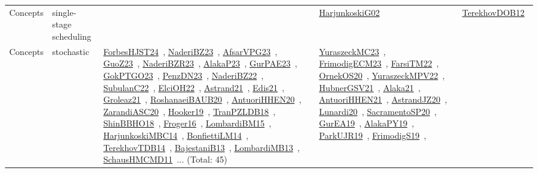 {\begin{longtable}{lp{3cm}>{\raggedright\arraybackslash}p{6cm}>{\raggedright\arraybackslash}p{6cm}>{\raggedright\arraybackslash}p{8cm}}
\index{single-stage scheduling}\index{Concepts!single-stage scheduling}Concepts & single-stage scheduling &  & \href{../works/HarjunkoskiG02.pdf}{HarjunkoskiG02}~\cite{HarjunkoskiG02} & \href{../works/TerekhovDOB12.pdf}{TerekhovDOB12}~\cite{TerekhovDOB12}\\
\index{stochastic}\index{Concepts!stochastic}Concepts & stochastic & \href{../works/ForbesHJST24.pdf}{ForbesHJST24}~\cite{ForbesHJST24}, \href{../works/NaderiBZ23.pdf}{NaderiBZ23}~\cite{NaderiBZ23}, \href{../works/AfsarVPG23.pdf}{AfsarVPG23}~\cite{AfsarVPG23}, \href{../works/GuoZ23.pdf}{GuoZ23}~\cite{GuoZ23}, \href{../works/NaderiBZR23.pdf}{NaderiBZR23}~\cite{NaderiBZR23}, \href{../works/AlakaP23.pdf}{AlakaP23}~\cite{AlakaP23}, \href{../works/GurPAE23.pdf}{GurPAE23}~\cite{GurPAE23}, \href{../works/GokPTGO23.pdf}{GokPTGO23}~\cite{GokPTGO23}, \href{../works/PenzDN23.pdf}{PenzDN23}~\cite{PenzDN23}, \href{../works/NaderiBZ22.pdf}{NaderiBZ22}~\cite{NaderiBZ22}, \href{../works/SubulanC22.pdf}{SubulanC22}~\cite{SubulanC22}, \href{../works/ElciOH22.pdf}{ElciOH22}~\cite{ElciOH22}, \href{../works/Astrand21.pdf}{Astrand21}~\cite{Astrand21}, \href{../works/Edis21.pdf}{Edis21}~\cite{Edis21}, \href{../works/Groleaz21.pdf}{Groleaz21}~\cite{Groleaz21}, \href{../works/RoshanaeiBAUB20.pdf}{RoshanaeiBAUB20}~\cite{RoshanaeiBAUB20}, \href{../works/AntuoriHHEN20.pdf}{AntuoriHHEN20}~\cite{AntuoriHHEN20}, \href{../works/ZarandiASC20.pdf}{ZarandiASC20}~\cite{ZarandiASC20}, \href{../works/Hooker19.pdf}{Hooker19}~\cite{Hooker19}, \href{../works/TranPZLDB18.pdf}{TranPZLDB18}~\cite{TranPZLDB18}, \href{../works/ShinBBHO18.pdf}{ShinBBHO18}~\cite{ShinBBHO18}, \href{../works/Froger16.pdf}{Froger16}~\cite{Froger16}, \href{../works/LombardiBM15.pdf}{LombardiBM15}~\cite{LombardiBM15}, \href{../works/HarjunkoskiMBC14.pdf}{HarjunkoskiMBC14}~\cite{HarjunkoskiMBC14}, \href{../works/BonfiettiLM14.pdf}{BonfiettiLM14}~\cite{BonfiettiLM14}, \href{../works/TerekhovTDB14.pdf}{TerekhovTDB14}~\cite{TerekhovTDB14}, \href{../works/BajestaniB13.pdf}{BajestaniB13}~\cite{BajestaniB13}, \href{../works/LombardiMB13.pdf}{LombardiMB13}~\cite{LombardiMB13}, \href{../works/SchausHMCMD11.pdf}{SchausHMCMD11}~\cite{SchausHMCMD11}... (Total: 45) & \href{../works/YuraszeckMC23.pdf}{YuraszeckMC23}~\cite{YuraszeckMC23}, \href{../works/FrimodigECM23.pdf}{FrimodigECM23}~\cite{FrimodigECM23}, \href{../works/FarsiTM22.pdf}{FarsiTM22}~\cite{FarsiTM22}, \href{../works/OrnekOS20.pdf}{OrnekOS20}~\cite{OrnekOS20}, \href{../works/YuraszeckMPV22.pdf}{YuraszeckMPV22}~\cite{YuraszeckMPV22}, \href{../works/HubnerGSV21.pdf}{HubnerGSV21}~\cite{HubnerGSV21}, \href{../works/Alaka21.pdf}{Alaka21}~\cite{Alaka21}, \href{../works/AntuoriHHEN21.pdf}{AntuoriHHEN21}~\cite{AntuoriHHEN21}, \href{../works/AstrandJZ20.pdf}{AstrandJZ20}~\cite{AstrandJZ20}, \href{../works/Lunardi20.pdf}{Lunardi20}~\cite{Lunardi20}, \href{../works/SacramentoSP20.pdf}{SacramentoSP20}~\cite{SacramentoSP20}, \href{../works/GurEA19.pdf}{GurEA19}~\cite{GurEA19}, \href{../works/AlakaPY19.pdf}{AlakaPY19}~\cite{AlakaPY19}, \href{../works/ParkUJR19.pdf}{ParkUJR19}~\cite{ParkUJR19}, \href{../works/FrimodigS19.pdf}{FrimodigS19}~\cite{FrimodigS19}, 
\end{longtable}}
